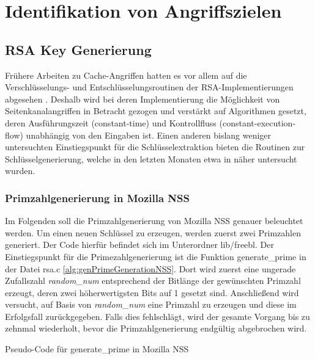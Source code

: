 \chapter{Identifikation von Angriffszielen}
\label{chapter:results}

\section{RSA Key Generierung}

Frühere Arbeiten zu Cache-Angriffen hatten es vor allem auf die Verschlüsselungs- und Entschlüsselungsroutinen der RSA-Implementierungen abgesehen \cite{FlushReload, CacheBleedOpenSSLRSA}.
Deshalb wird bei deren Implementierung die Möglichkeit von Seitenkanalangriffen in Betracht gezogen und verstärkt auf Algorithmen gesetzt, deren Ausführungszeit (constant-time) und Kontrollfluss (constant-execution-flow) unabhängig von den Eingaben ist.
Einen anderen bislang weniger untersuchten Einstiegspunkt für die Schlüsselextraktion bieten die Routinen zur Schlüsselgenerierung, welche in den letzten Monaten etwa in \cite{RSAKeyGeneration2} näher untersucht wurden.

\subsection{Primzahlgenerierung in Mozilla NSS}

Im Folgenden soll die Primzahlgenerierung von Mozilla NSS genauer beleuchtet werden.
Um einen neuen Schlüssel zu erzeugen, werden zuerst zwei Primzahlen generiert. 
Der Code hierfür befindet sich im Unterordner lib/freebl.
Der Einstiegspunkt für die Primezahlgenerierung ist die Funktion generate_prime in der Datei rsa.c \ref{alg:genPrimeGenerationNSS}.
Dort wird zuerst eine ungerade Zufallszahl \textit{random_num} entsprechend der Bitlänge der gewünschten Primzahl erzeugt, deren zwei höherwertigsten Bits auf 1 gesetzt sind.
Anschließend wird versucht, auf Basis von \textit{random_num} eine Primzahl zu erzeugen und diese im Erfolgsfall zurückgegeben.
Falls dies fehlschlägt, wird der gesamte Vorgang bis zu zehnmal wiederholt, bevor die Primzahlgenerierung endgültig abgebrochen wird.

\begin{algorithm}[h]
\DontPrintSemicolon
\caption{Pseudo-Code für generate_prime in Mozilla NSS}
\label{alg:genPrimeGenerationNSS}

\end{algorithm}

